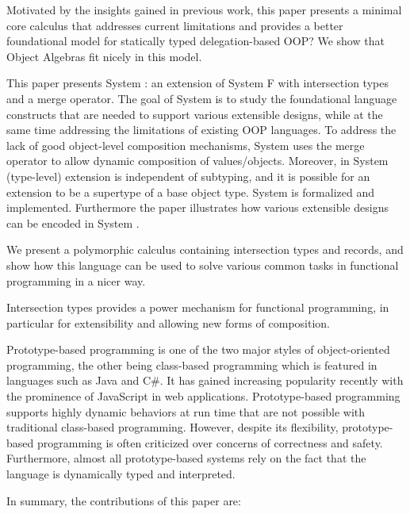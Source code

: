 Motivated by the insights gained in previous work, this paper presents 
a minimal core calculus that addresses current limitations and
provides a better foundational model for statically typed
delegation-based OOP? We show that Object Algebras fit nicely in this
model. 

This paper presents System \name: an extension of System F with
intersection types and a merge operator.  The goal of System \name is
to study the foundational language constructs that are needed to
support various extensible designs, while at the same time addressing
the limitations of existing OOP languages. To address the lack of good
object-level composition mechanisms, System \name uses the merge
operator to allow dynamic composition of values/objects. Moreover, in
System \name (type-level) extension is independent of subtyping, and
it is possible for an extension to be a supertype of a base object
type.  System \name is formalized and implemented. Furthermore the
paper illustrates how various extensible designs can be encoded in
System \name.

We present a polymorphic calculus containing intersection types and records, and show
how this language can be used to solve various common tasks in functional
programming in a nicer way.

Intersection types provides a power mechanism for functional programming, in
particular for extensibility and allowing new forms of composition.

Prototype-based programming is one of the two major styles of object-oriented
programming, the other being class-based programming which is featured in
languages such as Java and C\#. It has gained increasing popularity recently
with the prominence of JavaScript in web applications. Prototype-based
programming supports highly dynamic behaviors at run time that are not possible
with traditional class-based programming. However, despite its flexibility,
prototype-based programming is often criticized over concerns of correctness and
safety. Furthermore, almost all prototype-based systems rely on the fact that
the language is dynamically typed and interpreted.

In summary, the contributions of this paper are:

